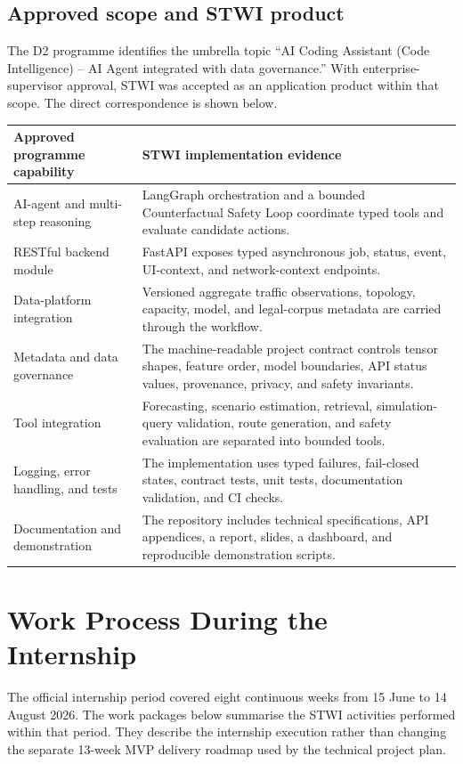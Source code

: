 \documentclass[12pt,a4paper]{report}
\begin{document}
\section{Approved scope and STWI product}

The D2 programme identifies the umbrella topic ``AI Coding Assistant (Code Intelligence) -- AI Agent integrated with data governance.'' With enterprise-supervisor approval, STWI was accepted as an application product within that scope. The direct correspondence is shown below.

\begin{longtable}{L{5.2cm}L{8.4cm}}
\toprule
\textbf{Approved programme capability} & \textbf{STWI implementation evidence}\\
\midrule
\endhead
AI-agent and multi-step reasoning & LangGraph orchestration and a bounded Counterfactual Safety Loop coordinate typed tools and evaluate candidate actions.\\
RESTful backend module & FastAPI exposes typed asynchronous job, status, event, UI-context, and network-context endpoints.\\
Data-platform integration & Versioned aggregate traffic observations, topology, capacity, model, and legal-corpus metadata are carried through the workflow.\\
Metadata and data governance & The machine-readable project contract controls tensor shapes, feature order, model boundaries, API status values, provenance, privacy, and safety invariants.\\
Tool integration & Forecasting, scenario estimation, retrieval, simulation-query validation, route generation, and safety evaluation are separated into bounded tools.\\
Logging, error handling, and tests & The implementation uses typed failures, fail-closed states, contract tests, unit tests, documentation validation, and CI checks.\\
Documentation and demonstration & The repository includes technical specifications, API appendices, a report, slides, a dashboard, and reproducible demonstration scripts.\\
\bottomrule
\end{longtable}

\chapter{Work Process During the Internship}

The official internship period covered eight continuous weeks from 15 June to 14 August 2026. The work packages below summarise the STWI activities performed within that period. They describe the internship execution rather than changing the separate 13-week MVP delivery roadmap used by the technical project plan.
\end{document}
